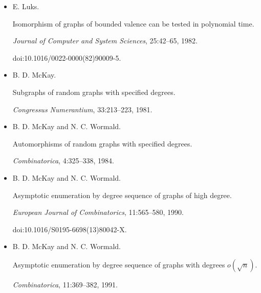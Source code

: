 \begin{itemize}
N. Linial and J. Mosheiff.


On the rigidity of sparse random graphs.


\emph{Journal of Graph Theory}, 85(2):466–480, 2017.


doi:10.1002/JGT.22073.





\item[] 
[40]

E. Luks.


Isomorphism of graphs of bounded valence can be tested in polynomial
time.


\emph{Journal of Computer and System Sciences}, 25:42–65, 1982.


doi:10.1016/0022-0000(82)90009-5.





\item[] 
[41]

B. D. McKay.


Subgraphs of random graphs with specified degrees.


\emph{Congressus Numerantium}, 33:213–223, 1981.





\item[] 
[42]

B. D. McKay and N. C. Wormald.


Automorphisms of random graphs with specified degrees.


\emph{Combinatorica}, 4:325–338, 1984.





\item[] 
[43]

B. D. McKay and N. C. Wormald.


Asymptotic enumeration by degree sequence of graphs of high degree.


\emph{European Journal of Combinatorics}, 11:565–580, 1990.


doi:10.1016/S0195-6698(13)80042-X.





\item[] 
[44]

B. D. McKay and N. C. Wormald.


Asymptotic enumeration by degree sequence of graphs with degrees
$o(\sqrt{n})$.


\emph{Combinatorica}, 11:369–382, 1991.






\end{itemize}
